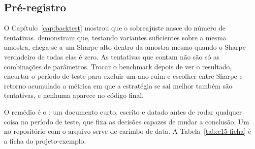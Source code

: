 \subsection{Pré-registro}
\label{sec:c15-prereg}

O Capítulo~\ref{cap:backtest} mostrou que o sobreajuste nasce do número de tentativas. \citet{bailey2014pseudo} demonstram que, testando variantes suficientes sobre a mesma amostra, chega-se a um Sharpe alto dentro da amostra mesmo quando o Sharpe verdadeiro de todas elas é zero. As tentativas que contam não são só as combinações de parâmetros. Trocar o benchmark depois de ver o resultado, encurtar o período de teste para excluir um ano ruim e escolher entre Sharpe e retorno acumulado a métrica em que a estratégia se sai melhor também são tentativas, e nenhuma aparece no código final.

O remédio é o : um documento curto, escrito e datado antes de rodar qualquer coisa no período de teste, que fixa as decisões capazes de mudar a conclusão. Um  no repositório com o arquivo  serve de carimbo de data. A Tabela~\ref{tab:c15-ficha} é a ficha do projeto-exemplo.

